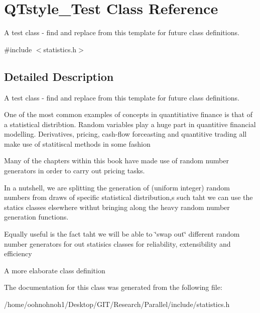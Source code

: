 \hypertarget{classQTstyle__Test}{}\section{Q\+Tstyle\+\_\+\+Test Class Reference}
\label{classQTstyle__Test}


A test class -\/ find and replace from this template for future class definitions.  




{\ttfamily \#include $<$statistics.\+h$>$}



\subsection{Detailed Description}
A test class -\/ find and replace from this template for future class definitions. 

One of the most common examples of concepts in quantitiative finance is that of a statistical distribtion. Random variables play a huge part in quantitive financial modelling. Derivatives, pricing, cash-\/flow forceasting and quantitive trading all make use of statitiscal methods in some fashion

Many of the chapters within this book have made use of random number generators in order to carry out pricing tasks.

In a nutshell, we are splitting the generation of (uniform integer) random numbers from draws of specific statistical distribution,s such taht we can use the statics classes elsewhere withut bringing along the heavy random number generation functions.

Equally useful is the fact taht we will be able to \char`\"{}swap out\char`\"{} different random number generators for out statisics classes for reliability, extensibility and efficiency

A more elaborate class definition 

The documentation for this class was generated from the following file\+:\begin{DoxyCompactItemize}
\item 
/home/oohnohnoh1/\+Desktop/\+G\+I\+T/\+Research/\+Parallel/include/statistics.\+h\end{DoxyCompactItemize}
